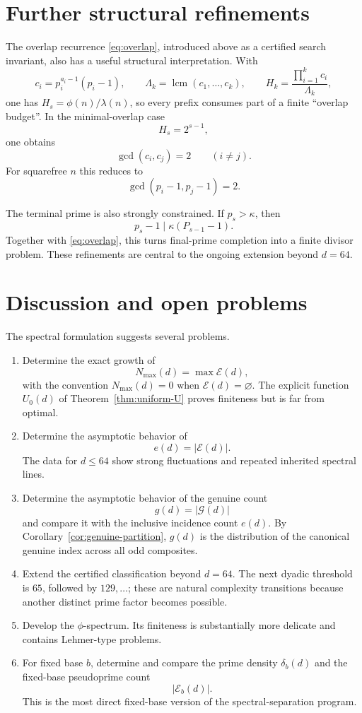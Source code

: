 \documentclass[11pt]{article}
\newcommand{\Eset}{\mathcal E}
\begin{document}
\section{Further structural refinements}

The overlap recurrence \eqref{eq:overlap}, introduced above as a certified
search invariant, also has a useful structural interpretation.  With
\[
c_i=p_i^{a_i-1}(p_i-1),
\qquad
\Lambda_k=\operatorname{lcm}(c_1,\ldots,c_k),
\qquad
H_k=\frac{\prod_{i=1}^k c_i}{\Lambda_k},
\]
one has $H_s=\phi(n)/\lambda(n)$, so every prefix consumes part of a finite
``overlap budget''.  In the minimal-overlap case
\[
H_s=2^{s-1},
\]
one obtains
\[
\gcd(c_i,c_j)=2
\qquad(i\ne j).
\]
For squarefree $n$ this reduces to
\[
\gcd(p_i-1,p_j-1)=2.
\]

The terminal prime is also strongly constrained.  If $p_s>\kappa$, then
\[
p_s-1\mid \kappa(P_{s-1}-1).
\]
Together with \eqref{eq:overlap}, this turns final-prime completion into
a finite divisor problem.  These refinements are central to the ongoing
extension beyond $d=64$.

\section{Discussion and open problems}

The spectral formulation suggests several problems.

\begin{enumerate}
\item
Determine the exact growth of
\[
N_{\max}(d)
=
\max\Eset(d),
\]
with the convention $N_{\max}(d)=0$ when $\Eset(d)=\varnothing$.
The explicit function $U_0(d)$ of
Theorem~\ref{thm:uniform-U} proves finiteness but is far
from optimal.

\item
Determine the asymptotic behavior of
\[
e(d)=|\Eset(d)|.
\]
The data for $d\le64$ show strong fluctuations and repeated inherited
spectral lines.

\item
Determine the asymptotic behavior of the genuine count
\[
g(d)=|\mathcal G(d)|
\]
and compare it with the inclusive incidence count $e(d)$.  By
Corollary~\ref{cor:genuine-partition}, $g(d)$ is the distribution of the
canonical genuine index across all odd composites.

\item
Extend the certified classification beyond $d=64$.  The next dyadic threshold is $65$, followed by $129,\ldots$; these are natural complexity transitions because another distinct prime factor becomes possible.

\item
Develop the $\phi$-spectrum.  Its finiteness is substantially more
delicate and contains Lehmer-type problems.

\item
For fixed base $b$, determine and compare the prime density
$\delta_b(d)$ and the fixed-base pseudoprime count
\[
|\Eset_b(d)|.
\]
This is the most direct fixed-base version of the spectral-separation
program.
\end{enumerate}
\end{document}
